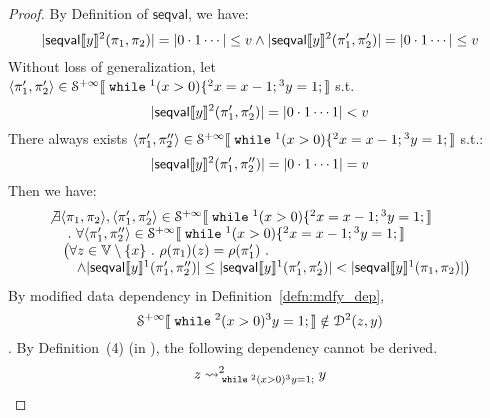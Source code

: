 \begin{example}
\begin{proof}
%
By Definition of $\mathsf{seqval}$, we have:
\[
	|\mathsf{seqval}\llbracket y \rrbracket{}^2(\pi_1, \pi_2 )| = | 0 \cdot 1 \cdots| \leq v
	\land
	|\mathsf{seqval}\llbracket y \rrbracket{}^2(\pi_1', \pi_2' )| = | 0 \cdot 1 \cdots| \leq v
\]
%
Without loss of generalization, let $\langle \pi_1', \pi_2' \rangle \in \mathcal{S}^{+\infty}\llbracket \;\mathtt{while}\; {}^1 (x > 0) \{{}^2 x = x - 1; {}^3 y = 1; \rrbracket $ s.t.
\[
|\mathsf{seqval}\llbracket y \rrbracket{}^2(\pi_1', \pi_2' )| = | 0 \cdot 1 \cdots 1| < v
\]
%
There always exists $\langle \pi_1', \pi_2'' \rangle \in \mathcal{S}^{+\infty}\llbracket \;\mathtt{while}\; {}^1 (x > 0) \{{}^2 x = x - 1; {}^3 y = 1; \rrbracket$ s.t.:
\[
	|\mathsf{seqval}\llbracket y \rrbracket{}^2(\pi_1', \pi_2'' )| = | 0 \cdot 1 \cdots 1| = v
\]
%
Then we have:
\[
	\begin{array}{l}
	\not\exists \langle \pi_1, \pi_2 \rangle, \langle \pi_1', \pi_2' \rangle \in \mathcal{S}^{+\infty}\llbracket \;\mathtt{while}\; {}^1 (x > 0) \{{}^2 x = x - 1; {}^3 y = 1; \rrbracket \\
	\quad ~.~ \forall \langle \pi_1', \pi_2'' \rangle \in \mathcal{S}^{+\infty}\llbracket \;\mathtt{while}\; {}^1 (x > 0) \{{}^2 x = x - 1; {}^3 y = 1; \rrbracket \\
	\quad \big(
	\forall z \in \mathbb{V}\setminus \{x\} ~.~ \rho(\pi_1)(z) = \rho(\pi_1') ~.~ \\
	\quad  \quad  \land |\mathsf{seqval}\llbracket y \rrbracket{}^1(\pi_1', \pi_2'')| 
	\leq |\mathsf{seqval}\llbracket y \rrbracket{}^1(\pi_1', \pi_2')| <  
	|\mathsf{seqval}\llbracket y \rrbracket{}^1(\pi_1, \pi_2)|\big) 	
	\end{array}
\]
%
By modified data dependency in Definition~\ref{defn:mdfy_dep},
\[
	\mathcal{S}^{+\infty}\llbracket \;\mathtt{while}\; {}^2 (x > 0) {}^3 y = 1; \rrbracket 
	\notin \mathcal{D}^2(z, y)
\].
%
By Definition~(4) (in \cite{cousot2019abstract}), the following dependency cannot be derived.
\[
	z \rightsquigarrow^{2}_{\;\mathtt{while}\; {}^2 (x > 0) {}^3 y = 1;} y
\]
%
%
\end{proof}
\end{example}